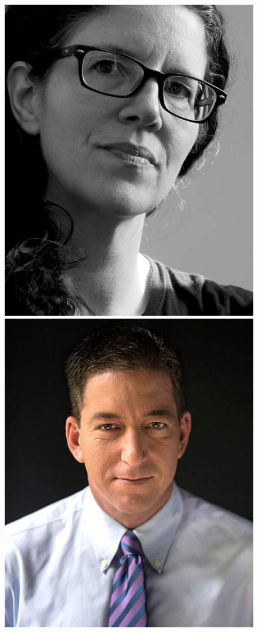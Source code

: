 \documentclass[12pt,a4paper]{scrartcl}
\begin{document}
\begin{figure}[h]
\centering
\begin{minipage}{0.5\textwidth}
	\centering
	\includegraphics[width=0.7\linewidth]{images/poitras.jpg}
\end{minipage}%
\begin{minipage}{.5\textwidth}
	\centering
	\includegraphics[width=0.7\linewidth]{images/greenwald.jpg}
\end{minipage}
\end{figure}
\end{document}
